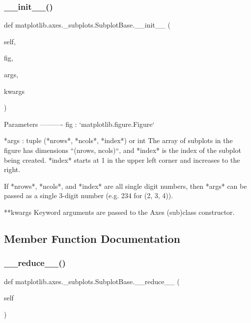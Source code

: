 \subsubsection{\texorpdfstring{\+\_\+\+\_\+init\+\_\+\+\_\+()}{\_\_init\_\_()}}
{\footnotesize\ttfamily def matplotlib.\+axes.\+\_\+subplots.\+Subplot\+Base.\+\_\+\+\_\+init\+\_\+\+\_\+ (\begin{DoxyParamCaption}\item[{}]{self,  }\item[{}]{fig,  }\item[{}]{args,  }\item[{}]{kwargs }\end{DoxyParamCaption})}

\begin{DoxyVerb}Parameters
----------
fig : `matplotlib.figure.Figure`

*args : tuple (*nrows*, *ncols*, *index*) or int
    The array of subplots in the figure has dimensions ``(nrows,
    ncols)``, and *index* is the index of the subplot being created.
    *index* starts at 1 in the upper left corner and increases to the
    right.

    If *nrows*, *ncols*, and *index* are all single digit numbers, then
    *args* can be passed as a single 3-digit number (e.g. 234 for
    (2, 3, 4)).

**kwargs
    Keyword arguments are passed to the Axes (sub)class constructor.
\end{DoxyVerb}
 

\subsection{Member Function Documentation}
\mbox{\label{classmatplotlib_1_1axes_1_1__subplots_1_1SubplotBase_a6adda293f5f19d94f7f5ca4b2ef75029}} 
\subsubsection{\texorpdfstring{\+\_\+\+\_\+reduce\+\_\+\+\_\+()}{\_\_reduce\_\_()}}
{\footnotesize\ttfamily def matplotlib.\+axes.\+\_\+subplots.\+Subplot\+Base.\+\_\+\+\_\+reduce\+\_\+\+\_\+ (\begin{DoxyParamCaption}\item[{}]{self }\end{DoxyParamCaption})}

